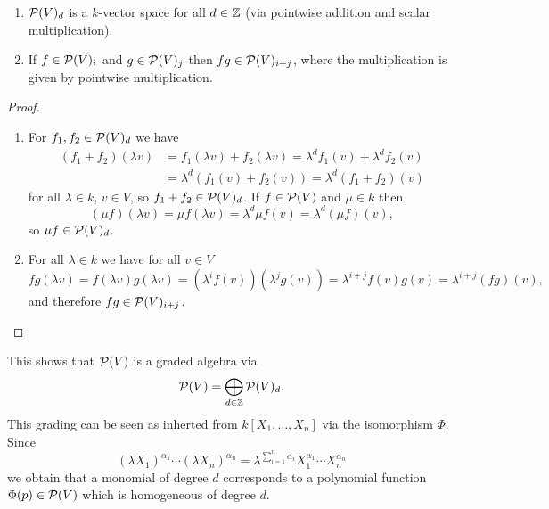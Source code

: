\begin{lem}
  \begin{enumerate}[label=\emph{\alph*)},leftmargin=*]
    \item
      $\mathcal{P}(V)_d$ is a $k$-vector space for all $d \in \mathbb{Z}$ (via pointwise addition and scalar multiplication).
    \item
      If $f \in \mathcal{P}(V)_i$ and $g \in \mathcal{P}(V)_j$ then $fg \in \mathcal{P}(V)_{i+j}$, where the multiplication is given by pointwise multiplication.
  \end{enumerate}
\end{lem}
\begin{proof}
  \begin{enumerate}[label=\emph{\alph*)},leftmargin=*]
    \item For $f_1, f_2 \in \mathcal{P}(V)_d$ we have
      \begin{align*}
            (f_1+f_2)(\lambda v)
        &=  f_1(\lambda v) + f_2(\lambda v)
         =  \lambda^d f_1(v) + \lambda^d f_2(v) \\
        &=  \lambda^d (f_1(v) + f_2(v))
         =  \lambda^d (f_1 + f_2)(v)
      \end{align*}
      for all $\lambda \in k$, $v \in V$, so $f_1 + f_2 \in \mathcal{P}(V)_d$. If $f \in \mathcal{P}(V)$ and $\mu \in k$ then
      \[
          (\mu f)(\lambda v)
        = \mu f(\lambda v)
        = \lambda^d \mu f(v)
        = \lambda^d (\mu f)(v),
      \]
      so $\mu f \in \mathcal{P}(V)_d$.
    \item
      For all $\lambda \in k$ we have for all $v \in V$
      \[
          fg(\lambda v)
        = f(\lambda v) g(\lambda v)
        = \left( \lambda^i f(v) \right)\left( \lambda^j g(v) \right)
        = \lambda^{i+j} f(v) g(v)
        = \lambda^{i+j} (fg)(v),
      \]
      and therefore $fg \in \mathcal{P}(V)_{i+j}$.
    \qedhere
  \end{enumerate}
\end{proof}

This shows that $\mathcal{P}(V)$ is a graded algebra via
\[
      \mathcal{P}(V)
    = \bigoplus_{d \in \mathbb{Z}} \mathcal{P}(V)_d.
\]
This grading can be seen as inherted from $k[X_1, \dotsc, X_n]$ via the isomorphism $\Phi$. Since
\[
    (\lambda X_1)^{\alpha_1} \dotsm (\lambda X_n)^{\alpha_n}
  = \lambda^{\sum_{i=1}^n \alpha_i} X_1^{\alpha_1} \dotsm X_n^{\alpha_n}
\]
we obtain that a monomial of degree $d$ corresponds to a polynomial function $\Phi(p) \in \mathcal{P}(V)$ which is homogeneous of degree $d$.


